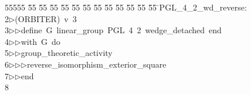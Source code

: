 %
%
\begin{tabbing}
55555 \= 55 \= 55 \= 55 \= 55 \= 55 \= 55 \= 55 \= 55 \= 55 \= 55 \= 55 \= 55 \= \>PGL\_4\_2\_wd\_reverse:\\[0pt]
2\>$\triangleright$\>(ORBITER)\ v\ 3\ \\[0pt]
3\>$\triangleright$\>$\triangleright$\>define\ G\ linear\_group\ PGL\ 4\ 2\ wedge\_detached\ end\ \\[0pt]
4\>$\triangleright$\>$\triangleright$\>with\ G\ do\ \\[0pt]
5\>$\triangleright$\>$\triangleright$\>group\_theoretic\_activity\ \\[0pt]
6\>$\triangleright$\>$\triangleright$\>$\triangleright$\>reverse\_isomorphism\_exterior\_square\ \\[0pt]
7\>$\triangleright$\>$\triangleright$\>end\\[0pt]
8\>\end{tabbing}

